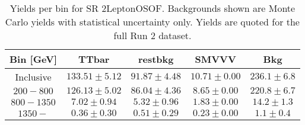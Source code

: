 \begin{table}[!htbp]
    \small
    \center
    \begin{tabular}{c|c|c|c||c}
    Bin [GeV] & TTbar & restbkg & SMVVV & Bkg\\
    \hline
    Inclusive & $133.51 \pm 5.12$ & $91.87 \pm 4.48$ & $10.71 \pm 0.00$ & $236.1 \pm 6.8$\\
    \hline
    $200-800$ & $126.13 \pm 5.02$ & $86.04 \pm 4.36$ & $8.65 \pm 0.00$ & $220.8 \pm 6.7$\\
    \hline
    $800-1350$ & $7.02 \pm 0.94$ & $5.32 \pm 0.96$ & $1.83 \pm 0.00$ & $14.2 \pm 1.3$\\
    \hline
    $1350-$ & $0.36 \pm 0.30$ & $0.51 \pm 0.29$ & $0.23 \pm 0.00$ & $1.1 \pm 0.4$\\
\end{tabular}
    \caption{Yields per bin for SR 2LeptonOSOF. Backgrounds shown are Monte Carlo yields with statistical uncertainty only. Yields are quoted for the full Run 2 dataset.}
    \label{tab:2LeptonOSOF$bins}
\end{table}
